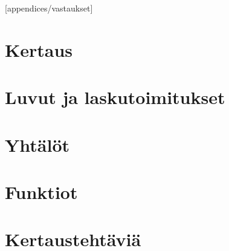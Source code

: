 [appendices/vastaukset]

\chapter*{Kertaus} 

\chapter{Luvut ja laskutoimitukset}
    
    
    
    
    
    

\chapter{Yhtälöt}
    
    
    
    
    

\chapter{Funktiot}
    
    
    
    

\chapter{Kertaustehtäviä}
    
    
    

